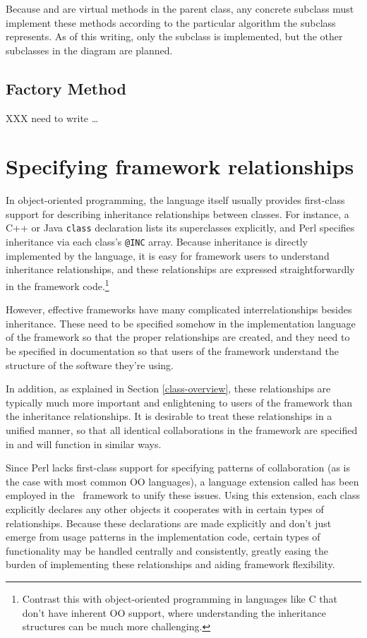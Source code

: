 Because  and  are
virtual methods in the parent class, any concrete subclass must
implement these methods according to the particular algorithm the
subclass represents.  As of this writing, only the
 subclass is implemented, but
the other subclasses in the diagram are planned.


\subsection{Factory Method}

XXX need to write \ldots


\section{Specifying framework relationships}

In object-oriented programming, the language itself usually provides
first-class support for describing inheritance relationships between
classes.  For instance, a C++ or Java \texttt{class} declaration lists
its superclasses explicitly, and Perl specifies inheritance via each
class's \texttt{@INC} array.  Because inheritance is directly
implemented by the language, it is easy for framework users to
understand inheritance relationships, and these relationships are
expressed straightforwardly in the framework code.\footnote{Contrast
this with object-oriented programming in languages like C that don't
have inherent OO support, where understanding the inheritance
structures can be much more challenging.\cite[p. 7]{fayad:99}}

However, effective frameworks have many complicated interrelationships
besides inheritance.  These need to be specified somehow in the
implementation language of the framework so that the proper
relationships are created, and they need to be specified in
documentation so that users of the framework understand the structure
of the software they're using.

In addition, as explained in Section \ref{class-overview}, these
relationships are typically much more important and enlightening to
users of the framework than the inheritance relationships.  It is
desirable to treat these relationships in a unified manner, so that
all identical collaborations in the framework are specified in and
will function in similar ways.\cite[p. 13]{fayad:99}

Since Perl lacks first-class support for specifying patterns of
collaboration (as is the case with most common OO languages), a
language extension called  has been employed
in the \aicat\ framework to unify these issues.  Using this extension,
each class explicitly
declares any other objects it cooperates with in certain types of
relationships.  Because these declarations are made explicitly and
don't just emerge from usage patterns in the implementation code,
certain types of functionality may be handled centrally and
consistently, greatly easing the burden of implementing these
relationships and aiding framework flexibility.

